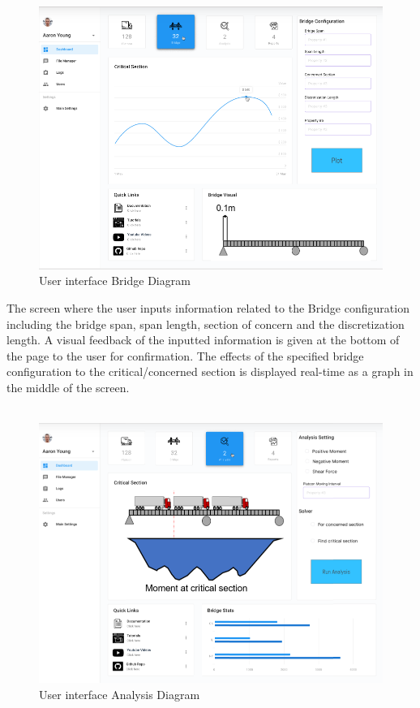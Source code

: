 \documentclass[12pt, titlepage]{article}
\begin{document}
\begin{figure}[H]
  \centering
  \includegraphics[]{../images/Userinterface-Bridge.PNG}
  \caption{User interface Bridge Diagram}
  \label{fig:userinterface-bridge-diagram}
\end{figure}
The screen where the user inputs information related to the Bridge configuration including the bridge span, span length, section of concern and the discretization length. A visual feedback of the inputted information is given at the bottom of the page to the user for confirmation. The effects of the specified bridge configuration to the critical/concerned section is displayed real-time as a graph in the middle of the screen.\\\\
\begin{figure}[H]
  \centering
  \includegraphics[]{../images/Userinterface-Analysis.PNG}
  \caption{User interface Analysis Diagram}
  \label{fig:userinterface-analysis-diagram}
\end{figure}
\end{document}
